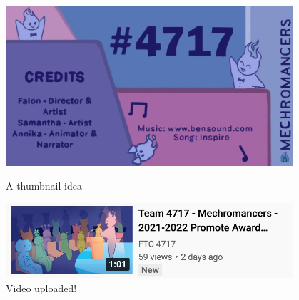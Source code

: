 \begin{figure}[ht]
\centering
\begin{minipage}[b]{.48\textwidth}
  \centering
  \includegraphics[width=0.95\textwidth]{Meetings/February/02-02-22/february 2___ - Falon Jones.png}
  \caption{A thumbnail idea}
  \label{fig:020222_1}
\end{minipage}%
\hfill%
\begin{minipage}[b]{.48\textwidth}
  \centering
  \includegraphics[width=0.95\textwidth]{Meetings/February/02-02-22/idk what day - Falon Jones.png}
  \caption{Video uploaded!}
  \label{fig:020222_2}
\end{minipage}
\end{figure}



